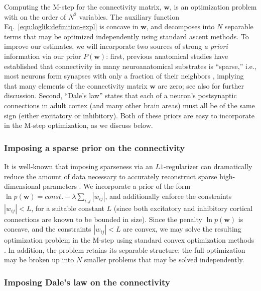 \documentclass[aoas,preprint]{imsart}
\newcommand{\w}{w}
\newcommand{\bw}{\mathbf{\w}}
\begin{document}
Computing the M-step for the connectivity matrix, $\bw$, is an optimization problem with on the order of $N^2$ variables. The auxiliary function Eq.~\eqref{eqn:loglik:definition-expl} is concave in $\bw$, and decomposes into $N$ separable terms that may be optimized independently using standard ascent methods. To improve our estimates, we will incorporate two sources of strong \emph{a priori} information via our prior $P(\bw)$: first, previous anatomical studies have established that connectivity in many neuroanatomical substrates is ``sparse,'' i.e., most neurons form synapses with only a fraction of their neighbors \cite{Buhl94,Thompson88,Reyes98,Feldmeyer99,Gupta00,FeldmeyerSakmann00,PetersenSakmann00,Binzegger04,Song2005,Mishchenko2009b}, implying that many elements of the connectivity matrix $\bw$ are zero; see also \cite{PAN04c,Rigat06,PILL07,Stevenson08} for further discussion. Second, ``Dale's law'' states that each of a neuron's postsynaptic connections in adult cortex (and many other brain areas) must all be of the same sign (either excitatory or inhibitory). Both of these priors are easy to incorporate in the M-step optimization, as we discuss below.


\subsubsection{Imposing a sparse prior on the connectivity}

It is well-known that imposing sparseness via an $L1$-regularizer can
dramatically reduce the amount of data necessary to accurately
reconstruct sparse high-dimensional parameters
\cite{Tibs96,TIP01,DE03,NG04,Candes2005,Mishchenko2009}. We
incorporate a prior of the form $\ln p(\bw) = const. - \lambda
\sum_{i,j} |\w_{ij}|$, and additionally enforce the constraints
$|\w_{ij}|<L$, for a suitable constant $L$ (since both excitatory and
inhibitory cortical connections are known to be bounded in
size). Since the penalty $\ln p(\bw)$ is concave, and the constraints
$|\w_{ij}|<L$ are convex, we may solve the resulting optimization
problem in the M-step using standard convex optimization methods
\cite{CONV04}. In addition, the problem retains its separable
structure: the full optimization may be broken up into $N$ smaller
problems that may be solved independently.

\subsubsection{Imposing Dale's law on the connectivity}
\end{document}
